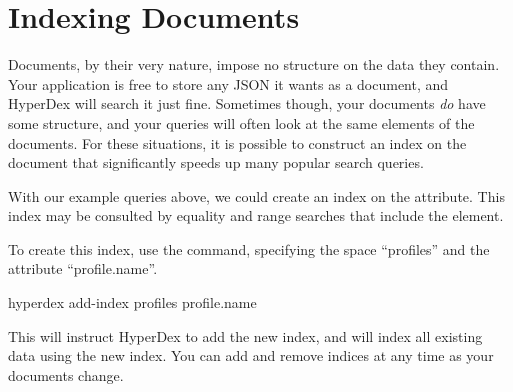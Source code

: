 \section{Indexing Documents}
\label{sec:documents:indexing}

Documents, by their very nature, impose no structure on the data they contain.
Your application is free to store any JSON it wants as a document, and HyperDex
will search it just fine.  Sometimes though, your documents {\em do} have some
structure, and your queries will often look at the same elements of the
documents.  For these situations, it is possible to construct an index on the
document that significantly speeds up many popular search queries.

With our example queries above, we could create an index on the
 attribute.  This index may be consulted by equality and
range searches that include the  element.

To create this index, use the  command, specifying the space
``profiles'' and the attribute ``profile.name''.

\begin{consolecode}
hyperdex add-index profiles profile.name
\end{consolecode}

This will instruct HyperDex to add the new index, and will index all existing
data using the new index.  You can add and remove indices at any time as your
documents change.
